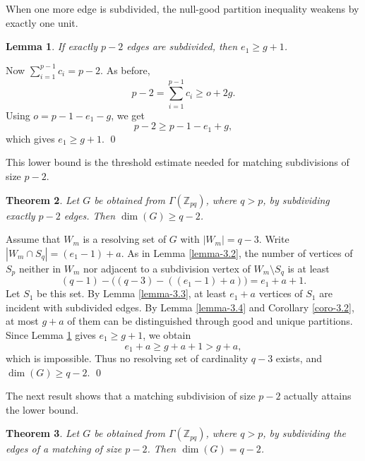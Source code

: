 \documentclass[12pt]{article}
\renewenvironment{proof}{{\bf \noindent Proof.}}{\qed}
\newtheorem{theorem}{Theorem}[section]
\newtheorem{lemma}[theorem]{Lemma}
\begin{document}
\medskip
\noindent When one more edge is subdivided, the null-good partition inequality weakens by exactly one unit.
\begin{lemma}\label{lemma-null-count-p2}
If exactly $p-2$ edges are subdivided, then $e_1\geq g+1$.
\end{lemma}

\begin{proof}
Now $\sum_{i=1}^{p-1}c_i=p-2$. As before,
$$
p-2=\sum_{i=1}^{p-1}c_i\geq o+2g.
$$
Using $o=p-1-e_1-g$, we get
$$
p-2\geq p-1-e_1+g,
$$
which gives $e_1\geq g+1$.
\end{proof}

\medskip
\noindent This lower bound is the threshold estimate needed for matching subdivisions of size $p-2$.
\begin{theorem}\label{theorem-3.2}
Let $G$ be obtained from $\Gamma(\mathbb Z_{pq})$, where $q>p$, by subdividing exactly $p-2$ edges. Then $\dim(G)\geq q-2$.
\end{theorem}

\begin{proof}
Assume that $W_m$ is a resolving set of $G$ with $|W_m|=q-3$. Write $|W_m\cap S_q|=(e_1-1)+a$. As in Lemma \ref{lemma-3.2}, the number of vertices of $S_p$ neither in $W_m$ nor adjacent to a subdivision vertex of $W_m\setminus S_q$ is at least
$$
(q-1)-\bigl((q-3)-((e_1-1)+a)\bigr)=e_1+a+1.
$$
Let $S_1$ be this set. By Lemma \ref{lemma-3.3}, at least $e_1+a$ vertices of $S_1$ are incident with subdivided edges. By Lemma \ref{lemma-3.4} and Corollary \ref{coro-3.2}, at most $g+a$ of them can be distinguished through good and unique partitions. Since Lemma \ref{lemma-null-count-p2} gives $e_1\geq g+1$, we obtain
$$
e_1+a\geq g+a+1>g+a,
$$
which is impossible. Thus no resolving set of cardinality $q-3$ exists, and $\dim(G)\geq q-2$.
\end{proof}

\medskip
\noindent The next result shows that a matching subdivision of size $p-2$ actually attains the lower bound.
\begin{theorem}\label{theorem-3.3}
Let $G$ be obtained from $\Gamma(\mathbb Z_{pq})$, where $q>p$, by subdividing the edges of a matching of size $p-2$. Then $\dim(G)=q-2$.
\end{theorem}
\end{document}
